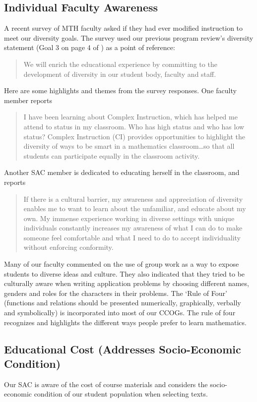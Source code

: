 \subsection{Individual Faculty Awareness}
A recent survey of MTH faculty asked if they had ever modified instruction to
meet our diversity goals. The survey used our previous program review's
diversity statement (Goal 3 on page 4 of \cite{mathprogramreview2003}) as a point of reference:
\begin{quote}
    We will enrich the educational experience by committing to the development
    of diversity in our student body, faculty and staff.
\end{quote}
Here are some highlights and themes from the survey responses. One faculty
member reports 
\begin{quote}
    I have been learning about Complex Instruction, which has helped me attend
    to status in my classroom. Who has high status and who has low status?
    Complex Instruction (CI) provides opportunities to highlight the diversity
    of ways to be smart in a mathematics classroom\ldots so that all students
    can participate equally in the classroom activity.
\end{quote}
Another SAC member is dedicated to educating herself in the classroom, and
reports
\begin{quote}
    If there is a cultural barrier, my awareness and appreciation of diversity
    enables me to want to learn about the unfamiliar, and educate about my own.
    My immense experience working in diverse settings with unique individuals
    constantly increases my awareness of what I can do to make someone feel
    comfortable and what I need to do to accept individuality without enforcing
    conformity.
\end{quote}
Many of our faculty commented on the use of group work as a way to expose
students to diverse ideas and culture.  They also indicated that they tried to
be culturally aware when writing application problems by choosing different
names, genders and roles for the characters in their problems. The `Rule of
Four' (functions and relations should be presented numerically, graphically,
verbally and symbolically) is incorporated into most of our CCOGs. The rule of
four recognizes and highlights the different ways people prefer to learn
mathematics.
\subsection{Educational Cost (Addresses Socio-Economic Condition)}
Our SAC is aware of the cost of course materials and considers the
socio-economic condition of our student population when selecting texts. 

